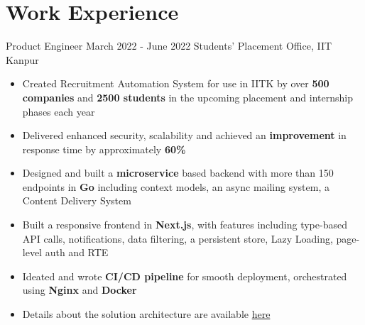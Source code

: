 \section*{\sc Work Experience}
\vspace{-2mm}
\hrulefill
\vspace{1mm}

\excventry
{Product Engineer}
{March 2022 - June 2022}
{Students' Placement Office, IIT Kanpur}
{
  \begin{itemize}
    \item Created Recruitment Automation System for use in IITK by over \textbf{500 companies} and \textbf{2500 students} in the upcoming placement and internship phases each year  
    \item Delivered enhanced security, scalability and achieved an \textbf{improvement} in response time by approximately \textbf{60\%}
    \item Designed and built a \textbf{microservice} based backend with more than 150 endpoints in \textbf{Go} including context models, an async mailing system, a Content Delivery System  
    \item Built a responsive frontend in \textbf{Next.js}, with features including type-based API calls, notifications, data filtering, a persistent store, Lazy Loading, page-level auth and RTE
    \item Ideated and wrote \textbf{CI/CD pipeline} for smooth deployment, orchestrated using \textbf{Nginx} and \textbf{Docker}
    \item Details about the solution architecture are available \href{https://abhishekshree.xyz/blog/engineering-ras}{here {\small \faExternalLink{}}}
  \end{itemize}
}



